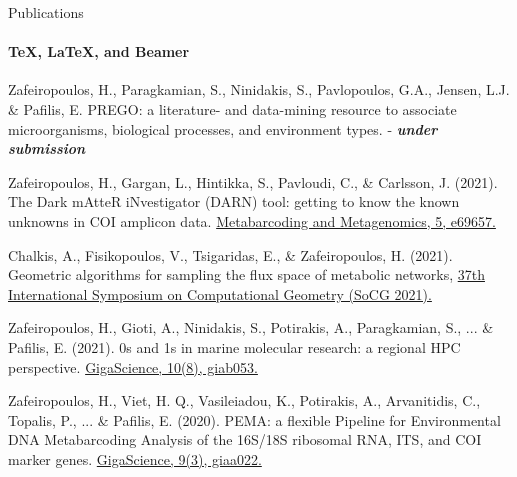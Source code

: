 \documentclass{beamer}
\begin{document}
   \begin{frame}[label=bibliography]{Publications}
      \framesubtitle{\TeX, \LaTeX, and Beamer}
      \begin{thebibliography}{9}

         \scriptsize
            Zafeiropoulos, H., Paragkamian, S., Ninidakis, S., Pavlopoulos, G.A., Jensen, L.J. \& Pafilis, E. PREGO: a literature- and data-mining resource to associate microorganisms, biological processes, and environment types. \href{}{} - \textbf{\textit{under submission}}


         \scriptsize
            Zafeiropoulos, H., Gargan, L., Hintikka, S., Pavloudi, C., \& Carlsson, J. (2021). The Dark mAtteR iNvestigator (DARN) tool: getting to know the known unknowns in COI amplicon data. \href{https://mbmg.pensoft.net/article/69657/list/9/}{Metabarcoding and Metagenomics, 5, e69657.}
         \scriptsize

            Chalkis, A., Fisikopoulos, V., Tsigaridas, E., \& Zafeiropoulos, H. (2021). Geometric algorithms for sampling the flux space of metabolic networks, \href{ https://drops.dagstuhl.de/opus/volltexte/2021/13820/}{37th International Symposium on Computational Geometry (SoCG 2021).}

         \scriptsize
            Zafeiropoulos, H., Gioti, A., Ninidakis, S., Potirakis, A., Paragkamian, S., ... \& Pafilis, E. (2021). 0s and 1s in marine molecular research: a regional HPC perspective. \href{https://academic.oup.com/gigascience/article/10/8/giab053/6353916}{GigaScience, 10(8), giab053.}

         \scriptsize
            Zafeiropoulos, H., Viet, H. Q., Vasileiadou, K., Potirakis, A., Arvanitidis, C., Topalis, P., ... \& Pafilis, E. (2020). PEMA: a flexible Pipeline for Environmental DNA Metabarcoding Analysis of the 16S/18S ribosomal RNA, ITS, and COI marker genes. \href{https://academic.oup.com/gigascience/article/9/3/giaa022/5803335}{GigaScience, 9(3), giaa022.}
 
      \end{thebibliography}
    \end{frame}
\end{document}
